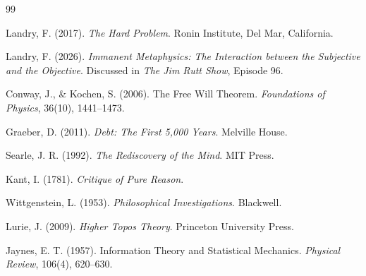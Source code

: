 \documentclass[11pt,a4paper]{article}
\theoremstyle{definition}
\theoremstyle{remark}
\begin{document}
\begin{thebibliography}{99}

Landry, F. (2017).
\textit{The Hard Problem}.
Ronin Institute, Del Mar, California.

Landry, F. (2026).
\textit{Immanent Metaphysics: The Interaction between the Subjective and the Objective}.
Discussed in \textit{The Jim Rutt Show}, Episode 96.

Conway, J., \& Kochen, S. (2006).
The Free Will Theorem.
\textit{Foundations of Physics}, 36(10), 1441--1473.

Graeber, D. (2011).
\textit{Debt: The First 5,000 Years}.
Melville House.

Searle, J. R. (1992).
\textit{The Rediscovery of the Mind}.
MIT Press.

Kant, I. (1781).
\textit{Critique of Pure Reason}.

Wittgenstein, L. (1953).
\textit{Philosophical Investigations}.
Blackwell.

Lurie, J. (2009).
\textit{Higher Topos Theory}.
Princeton University Press.

Jaynes, E. T. (1957).
Information Theory and Statistical Mechanics.
\textit{Physical Review}, 106(4), 620--630.

\end{thebibliography}
\end{document}
